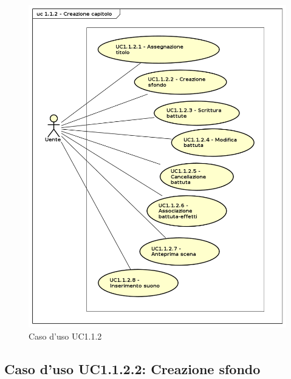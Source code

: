 \begin{figure}[htbp]
\centering
\includegraphics[scale=0.5]{immagini/uc1_1_2_creazione_capitolo.png}
\captionsetup{labelfont=bf}
\caption{Caso d'uso UC1.1.2}
\end{figure}
\newpage

\subsection{Caso d'uso UC1.1.2.2: Creazione sfondo}
\label{sec:UC1.1.2.2}

